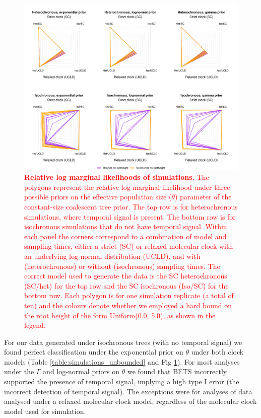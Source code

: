 \documentclass[10pt,letterpaper]{article}
\begin{document}
\begin{figure}[!h]
	\begin{center}
		\includegraphics[width=14cm]{sandbox_figures/coalescent_constant_sims.pdf}\newline
		\vspace{-0.3cm}
		\caption{\textcolor{red}{\textbf{Relative log marginal likelihoods of simulations.} The polygons represent the relative log marginal likelihood under three possible priors on the effective population size ($\theta$) parameter of the constant-size coalescent tree prior. The top row is for heterochronous simulations, where temporal signal is present. The bottom row is for isochronous simulations that do not have temporal signal. Within each panel the corners correspond to a combination of model and sampling times, either a strict (SC) or relaxed molecular clock with an underlying log-normal distribution (UCLD), and with (heterochronous) or without (isochronous) sampling times. The correct model used to generate the data is the SC heterochronous (SC/het) for the top row and the SC isochronous (Iso/SC) for the bottom row. Each polygon is for one simulation replicate (a total of ten) and the colours denote whether we employed a hard bound on the root height of the form Uniform(0.0, 5.0), as shown in the legend.}}
		\label{figure:SC_polygons}
	\end{center}
\end{figure}

For our data generated under isochronous trees (with no temporal signal) we found perfect classification under the exponential prior on $\theta$ under both clock models (Table \ref{table:simulations_unbounded} and Fig \ref{figure:SC_polygons}). For most analyses under the $\Gamma$ and log-normal priors on $\theta$ we found that BETS incorrectly supported the presence of temporal signal, implying a high type I error (the incorrect detection of temporal signal). The exceptions were for analyses of data analysed under a relaxed molecular clock model, regardless of the molecular clock model used for simulation. 
\end{document}

